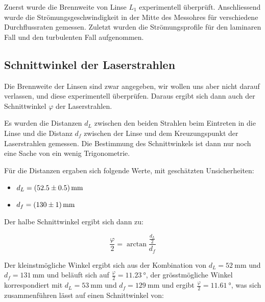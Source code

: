 Zuerst    wurde    die    Brennweite    von    Linse    $L_1$    experimentell
\"uberpr\"uft. Anschliessend wurde die Str\"omungsgeschwindigkeit in der Mitte
des  Messohres  f\"ur  verschiedene Durchflussraten  gemessen. Zuletzt  wurden
die  Str\"omungsprofile f\"ur  den  laminaren Fall  und  den turbulenten  Fall
aufgenommen.

\subsection{Schnittwinkel der Laserstrahlen}
\label{subsec:varphi}

Die Brennweite der Linsen sind zwar angegeben, wir wollen uns aber nicht darauf
verlassen, und diese experimentell \"uberpr\"ufen. Daraus ergibt sich dann auch
der Schnittwinkel $\varphi$ der Laserstrahlen.

 Es wurden die Distanzen $d_L$ zwischen  den beiden Strahlen beim Eintreten in
die Linse und die Distanz $d_f$  zwischen der Linse und dem Kreuzungspunkt der
Laserstrahlen gemessen. Die  Bestimmung des  Schnittwinkels ist dann  nur noch
eine Sache von ein wenig Trigonometrie.

F\"ur   die  Distanzen   ergaben  sich   folgende  Werte,   mit  gesch\"atzten
Unsicherheiten:

\begin{itemize}
    \item
        $ d_L = \SI{52.5 \pm 0.5}{\milli\meter}$
    \item
        $ d_f = \SI{130 \pm 1}{\milli\meter}$
\end{itemize}

Der halbe Schnittwinkel ergibt sich dann zu:

\begin{equation}
    \label{eq:varphi_half}
    \frac{\varphi}{2} = \arctan \frac{\frac{d_L}{2}}{d_f}
\end{equation}

Der kleinstm\"ogliche Winkel ergibt sich aus der Kombination von
$d_L = \SI{52}{\milli\meter}$
und
$d_f = \SI{131}{\milli\meter}$
und
bel\"auft sich auf
$\frac{\varphi}{2} = \SI{11.23}{\degree}$,
der gr\"osstm\"ogliche Winkel korrespondiert mit
$d_L = \SI{53}{\milli\meter}$
und
$d_f = \SI{129}{\milli\meter}$
und ergibt
$\frac{\varphi}{2} = \SI{11.61}{\degree}$,
was sich zusammenf\"uhren l\"asst auf einen Schnittwinkel von:

